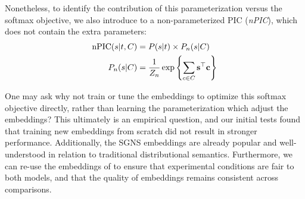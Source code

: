 Nonetheless, to identify the contribution of this parameterization versus the
softmax objective, we also introduce to a non-parameterized PIC ({\em nPIC}),
which does not contain the extra parameters:
\begin{equation}
  \begin{aligned}
  \mbox{nPIC}(s | t, C) &= P(s | t) \times P_n(s | C)\\
  P_n(s | C) &= \frac{1}{Z_n}\exp\left\{\sum_{c\in C}{\mathbf{s}}^\top {\mathbf{c}}\right\}
  \end{aligned}
  \label{eqn:npic}
\end{equation}

One may ask why not train or tune the embeddings to optimize this softmax
objective directly, rather than learning the parameterization which adjust the
embeddings? This ultimately is an empirical question, and our initial tests
found that training new embeddings from scratch did not result in stronger
performance. Additionally, the SGNS embeddings are already popular and
well-understood in relation to traditional distributional semantics.
Furthermore, we can re-use the embeddings of  to
ensure that experimental conditions are fair to both models, and that
the quality of embeddings remains consistent across comparisons.



